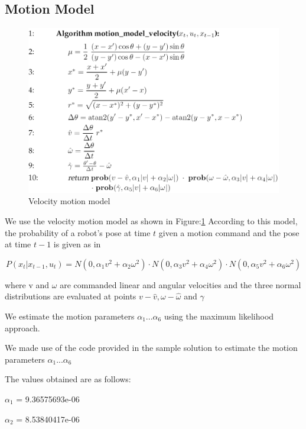 \documentclass[10pt]{scrartcl}
\begin{document}
\newpage

\subsection{Motion Model}

\begin{figure}[H]
\centering
\includegraphics[scale=0.2]{images/velocity-motion-model}
\caption{Velocity motion model \cite{MotionModel}}
\label{fig:motionmodel}
\end{figure}

We use the velocity motion model as shown in Figure:\ref{fig:motionmodel} According to this model, the probability of a robot’s pose at time $t$ given a motion command and the pose at time $t − 1$ is given as in \cite{Alex}

\[
	P(x_t|x_{t-1},u_t) = N(0,\alpha_1 v^2+\alpha_2 \omega^2) \cdot
						 N(0,\alpha_3 v^2+\alpha_4 \omega^2) \cdot
						 N(0,\alpha_5 v^2+\alpha_6 \omega^2)
\]

where v and $\omega$ are commanded linear and angular velocities and the three normal distributions are evaluated at points 
$v - \hat{v} , \omega - \hat{\omega} $ and $\gamma$


We estimate the motion parameters $\alpha_1 ... \alpha_6$ using the maximum likelihood approach.

We made use of the code provided in the sample solution \cite{Alex} to estimate the  motion parameters $\alpha_1 ... \alpha_6$

The values obtained are as follows: 

$\alpha_1$ =  9.36575693e-06 

$\alpha_2$ =  8.53840417e-06
\end{document}
